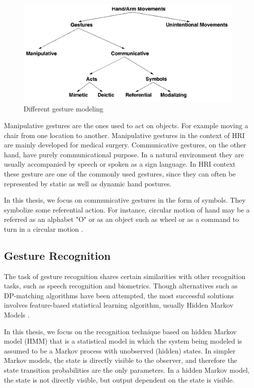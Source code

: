 \begin{figure}
	[h] \centering 
	\includegraphics[width=13cm]{figures/ges-tax.png} 
	\caption{Different gesture modeling} 
	\label{fig:ges:tax} 
\end{figure}

Manipulative gestures are the ones used to act on objects. For example moving a chair from one location to another. Manipulative gestures in the context of HRI are mainly developed for medical surgery. Communicative gestures, on the other hand, have purely communicational purpose. In a natural environment they are usually accompanied by speech or spoken as a sign language. In HRI context these gesture are one of the commonly used gestures, since they can often be represented by static as well as dynamic hand postures.

In this thesis, we focus on communicative gestures in the form of symbols. They symbolize some referential action. For instance, circular motion of hand may be a referred as an alphabet "O" or as an object such as wheel or as a command to turn in a circular motion .


\subsection{Gesture Recognition}
The task of gesture recognition shares certain similarities with other recognition tasks, such as speech recognition and biometrics. Though alternatives such as DP-matching algorithms have been attempted, the most successful solutions involves feature-based statistical learning algorithm, usually Hidden Markov Models \cite{5}. 

In this thesis, we focus on the recognition technique based on hidden Markov model (HMM) that is a statistical model in which the system being modeled is assumed to be a Markov process with unobserved (hidden) states. In simpler Markov models, the state is directly visible to the observer, and therefore the state transition probabilities are the only parameters. In a hidden Markov model, the state is not directly visible, but output dependent on the state is visible.


